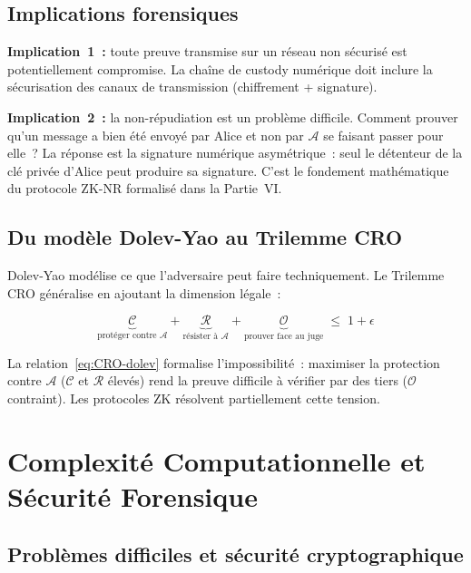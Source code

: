 \subsection{Implications forensiques}

\textbf{Implication~1~:} toute preuve transmise sur un réseau non sécurisé
est potentiellement compromise. La chaîne de custody numérique doit inclure
la sécurisation des canaux de transmission (chiffrement + signature).

\textbf{Implication~2~:} la non-répudiation est un problème difficile.
Comment prouver qu'un message a bien été envoyé par Alice et non par
$\mathcal{A}$ se faisant passer pour elle~? La réponse est la signature
numérique asymétrique~: seul le détenteur de la clé privée d'Alice peut
produire sa signature. C'est le fondement mathématique du protocole ZK-NR
\cite{minka2025zknr} formalisé dans la Partie~VI.

\subsection{Du modèle Dolev-Yao au Trilemme CRO}

Dolev-Yao modélise ce que l'adversaire peut faire techniquement.
Le Trilemme CRO généralise en ajoutant la dimension légale~:

\begin{equation}
\underbrace{\mathcal{C}}_{\text{protéger contre }\mathcal{A}} +
\underbrace{\mathcal{R}}_{\text{résister à }\mathcal{A}} +
\underbrace{\mathcal{O}}_{\text{prouver face au juge}}
\;\leq\; 1 + \epsilon
\label{eq:CRO-dolev}
\end{equation}

La relation~\eqref{eq:CRO-dolev} formalise l'impossibilité~: maximiser la
protection contre $\mathcal{A}$ ($\mathcal{C}$ et $\mathcal{R}$ élevés) rend
la preuve difficile à vérifier par des tiers ($\mathcal{O}$ contraint).
Les protocoles ZK résolvent partiellement cette tension.

\section{Complexité Computationnelle et Sécurité Forensique}
\label{sec:complexite}

\subsection{Problèmes difficiles et sécurité cryptographique}

